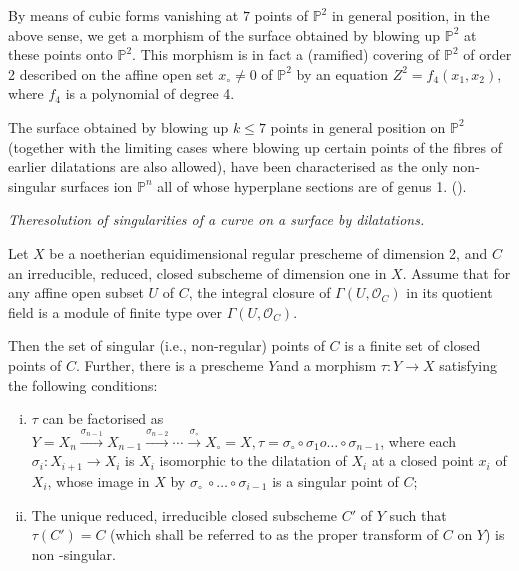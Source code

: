 By means of cubic forms vanishing at $7$ points of $\mathbb{P}^2$ in
general position, in the above sense, we get a morphism of the
surface obtained by blowing up $\mathbb{P}^2$ at these points onto
$\mathbb{P}^2$. This morphism is in fact a (ramified) covering of
$\mathbb{P}^2$ of order 2 described on the affine open set $x_\circ \neq
0$ of $\mathbb{P}^2$ by an equation $Z^2 = f_4(x_1, x_2)$, where $f_4$
is a polynomial of degree 4. 

The surface obtained by blowing up $ k \leq 7$ points in general
position on $\mathbb{P}^2$ (together with the limiting cases where
blowing up certain points of the fibres of earlier dilatations are also
allowed), have been characterised as the only non-singular surfaces
ion $\mathbb{P}^n$ all of whose hyperplane sections are of genus
1. (\cite{key4}). 

\noindent
\textit{The\pageoriginale resolution of singularities of a curve on a
  surface by dilatations.}   

\noindent
\begin{theorem*}[M.Noether]
Let $X$ be a noetherian equidimensional regular prescheme of
    dimension 2, and $C$ an irreducible, reduced, closed subscheme
    of dimension one in $X$. Assume that for any affine open subset
    $U$ of $C$, the integral closure of $\Gamma (U, \mathscr{O}_C)$ in
    its quotient field is a module of finite type over $\Gamma (U,
    \mathscr{O}_C)$. 

Then the set of singular (i.e., non-regular) points of $C$ is
  a finite set of closed points of $C$. Further, there is a prescheme
  $Y$and a morphism $\tau : Y \to X$ satisfying the following
  conditions: 
\begin{enumerate}[(i)]
\item $\tau$ can be factorised as $Y = X_n
  \xrightarrow{\sigma_{ n-1}} X_{n-1} \xrightarrow{\sigma_{ n-2}}
  \cdots \xrightarrow{\sigma_\circ} X_\circ = X, \tau =
  \sigma_\circ\circ\sigma_1 o 
  \ldots\circ\sigma_{n-1}$, where each $ \sigma _i : X_{i+1}
  \to X_i$ is $X_i$ isomorphic to the dilatation of $X_i$
  at a closed point $x_i$ of $X_i$, whose image in
    $X$ by  $\sigma_\circ~\circ\ldots\circ\sigma_{i-1}$ is a singular
    point of $C$; 

\item The unique reduced, irreducible closed subscheme $C'$ of
  $Y$ such that $\tau(C') = C$ (which shall be referred to as the
  proper transform of $C$ on $Y$) is non -singular. 
\end{enumerate}
\end{theorem*}

